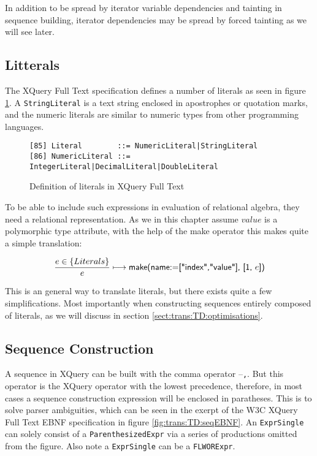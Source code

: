 In addition to be spread by iterator variable dependencies and tainting in sequence building, iterator dependencies
may be spread by forced tainting as we will see later. 

\subsection{Litterals}
\label{sect:trans:TD:litteral}

The XQuery Full Text specification\cite{w3c01} defines a number of literals as seen in figure
\ref{fig:trans:TD:litEBNF}. A \texttt{StringLiteral} is a text string enclosed in apostrophes or quotation marks,
and the numeric literals are similar to numeric types from other programming languages. 

\begin{figure}[h]
\begin{Verbatim}
[85] Literal        ::= NumericLiteral|StringLiteral
[86] NumericLiteral ::= IntegerLiteral|DecimalLiteral|DoubleLiteral
\end{Verbatim}
\caption[Literals in XQuery]{Definition of literals in XQuery Full Text}
\label{fig:trans:TD:litEBNF}
\end{figure}

To be able to include such expressions in evaluation of relational algebra, they need a relational representation.
As we in this chapter assume $value$ is a polymorphic type attribute, with the help of the \textsf{make} operator
this makes quite a simple translation:

\begin{equation}
\frac{e \in \left\{Literals\right\}}{e}\longmapsto
\mbox{\textsf{make(name:=["index","value"], [1, }}e\mbox{\textsf{])}}
\label{rule:trans:TD:literal}
\end{equation}

This is an general way to translate literals, but there exists quite a few simplifications. Most importantly when
constructing sequences entirely composed of literals, as we will discuss in section
\ref{sect:trans:TD:optimisations}.

\subsection{Sequence Construction}
\label{sect:trans:TD:seqBuild}

A sequence in XQuery can be built with the comma operator --\texttt{,}. But this operator is the XQuery operator
with the lowest precedence, therefore, in most cases a sequence construction expression will be enclosed in
paratheses. This is to solve parser ambiguities, which can be seen in the exerpt of the W3C XQuery Full Text EBNF
specification\cite{w3c01} in figure \ref{fig:trans:TD:seqEBNF}. An \texttt{ExprSingle} can solely consist of a
\texttt{ParenthesizedExpr} via a series of productions omitted from the figure. Also note a \texttt{ExprSingle}
can be a \texttt{FLWORExpr}.

